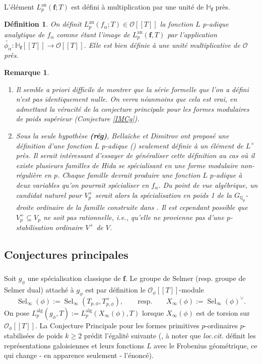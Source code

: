 \documentclass[12pt]{amsart}
\newcommand\bH{\mathbb{H}}
\newcommand\Qp{\mathbb{Q}_{p}}
\newcommand\cO{\mathcal{O}}
\newcommand{\an}{\textrm{an}}
\newcommand{\alg}{\textrm{alg}}
\DeclareMathOperator{\Sel}{Sel}
\theoremstyle{defstyle}
\newtheorem{definition}[subsubsection]{Définition}
\newtheorem{remarque}[subsubsection]{Remarque}
\theoremstyle{thmstyle}
\begin{document}
L'élément $L^\an_p(\textbf{f};T)$ est défini à multiplication par une unité de $\bH_\textbf{f}$ près.

\begin{definition}\label{def:cL_p_f_alpha}
	On définit $L^\an_p(f_\alpha;T) \in \cO[[T]]$ la fonction $L$ $p$-adique analytique de $f_\alpha$ comme étant l'image de $L^\an_p(\textbf{f},T)$ par l'application $\tilde{\phi_{\alpha}} : \bH_\textbf{f}[[T]]  \longrightarrow \cO[[T]]$. Elle est bien définie à une unité multiplicative de $\cO$ près. 
\end{definition}

\begin{remarque}
	\begin{enumerate}
		\item Il semble a priori difficile de montrer que la série formelle que l'on a défini n'est pas identiquement nulle. On verra néanmoins que cela est vrai, en admettant la véracité de la conjecture principale pour les formes modulaires de poids supérieur (Conjecture \ref{IMCg}).
		\item Sous la seule hypothèse \textbf{(rég)}, Bellaïche et Dimitrov ont proposé une définition d'une fonction $L$ $p$-adique (\cite[Corollary 1.3]{bellaiche2016eigencurve}) seulement définie à un élément de $L^\times$ près. Il serait intéressant d'essayer de généraliser cette définition au cas où il existe plusieurs familles de Hida se spécialisant en une forme modulaire non-régulière en $p$. Chaque famille devrait produire une fonction $L$ $p$-adique à deux variables qu'on pourrait spécialiser en $f_\alpha$. Du point de vue algébrique, un candidat naturel pour $V^+_p$ serait alors la spécialisation en poids 1 de la $G_{\Qp}$-droite ordinaire de la famille construite dans \cite[Theorem 2.2.2]{wiles1988ordinary}. Il est cependant possible que $V_p^+\subseteq V_p$ ne soit pas rationnelle, i.e., qu'elle ne provienne pas d'une $p$-stabilisation ordinaire $V^+$ de $V$.
	\end{enumerate}
\end{remarque}

\subsection{Conjectures principales}
\subsubsection{}\label{selphi}
Soit $g_\phi$ une spécialisation classique de $\textbf{f}$. Le groupe de Selmer (resp. groupe de Selmer dual) attaché à $g_\phi$ est par définition le $\cO_\phi[[T]]$-module
$$\Sel_{\infty}(\phi):=\Sel_{\infty}(T_{p,\phi},T_{p,\phi}^+), \qquad \textrm{resp.} \qquad X_{\infty}(\phi):=\Sel_{\infty}(\phi)^\vee.$$
On pose $L_p^{\alg}(g_\phi,T):=L_p^{\alg}(X_\infty(\phi),T)$ lorsque $X_\infty(\phi)$ est de torsion sur $\cO_\phi[[T]]$. La Conjecture Principale pour les formes primitives $p$-ordinaires $p$-stabilisées de poids $k \geq 2$ prédit l'égalité suivante (\cite[Conjecture 3.24]{skinner2014iwasawa}, à noter que \textit{loc.cit.} définit les représentations galoisiennes et leurs fonctions $L$ avec le Frobenius géométrique, ce qui change - en apparence seulement - l'énoncé).
\end{document}
